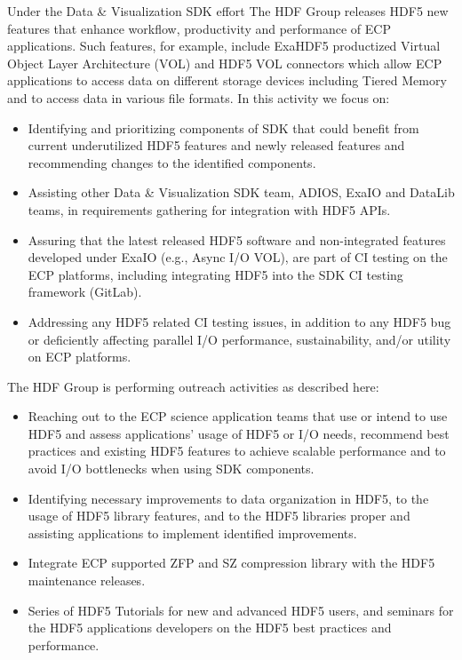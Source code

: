 Under the Data & Visualization SDK effort The HDF Group releases HDF5 new features that enhance workflow, productivity and performance of ECP applications. Such features, for example, include ExaHDF5 productized Virtual Object Layer Architecture (VOL) and HDF5 VOL connectors which allow ECP applications to access data on different storage devices including Tiered Memory and to access data in various file formats. 
In this activity we focus on:
\begin{itemize}
    \item Identifying and prioritizing components of SDK that could benefit from current underutilized HDF5 features and newly released features and recommending changes to the identified components.
    \item Assisting other Data & Visualization SDK team, ADIOS, ExaIO and DataLib teams, in requirements gathering for integration with HDF5 APIs.
    \item Assuring that the latest released HDF5 software and non-integrated features developed under ExaIO (e.g., Async I/O VOL), are part of CI testing on the ECP platforms, including integrating HDF5 into the SDK CI testing framework (GitLab).
    \item Addressing any HDF5 related CI testing issues, in addition to any HDF5 bug or deficiently affecting parallel I/O performance, sustainability, and/or utility on ECP platforms. 
\end{itemize}
The HDF Group is performing outreach activities as described here:
\begin{itemize}
    \item Reaching out to the ECP science application teams that use or intend to use HDF5 and assess applications’ usage of HDF5 or I/O needs, recommend best practices and existing HDF5 features to achieve scalable performance and to avoid I/O bottlenecks when using SDK components.
    \item Identifying necessary improvements to data organization in HDF5, to the usage of HDF5 library features, and to the HDF5 libraries proper and assisting applications to implement identified improvements.
    \item Integrate ECP supported ZFP and SZ compression library with the HDF5 maintenance releases.
    \item Series of HDF5 Tutorials for new and advanced HDF5 users, and seminars for the HDF5 applications developers on the HDF5 best practices and performance.
\end{itemize}

